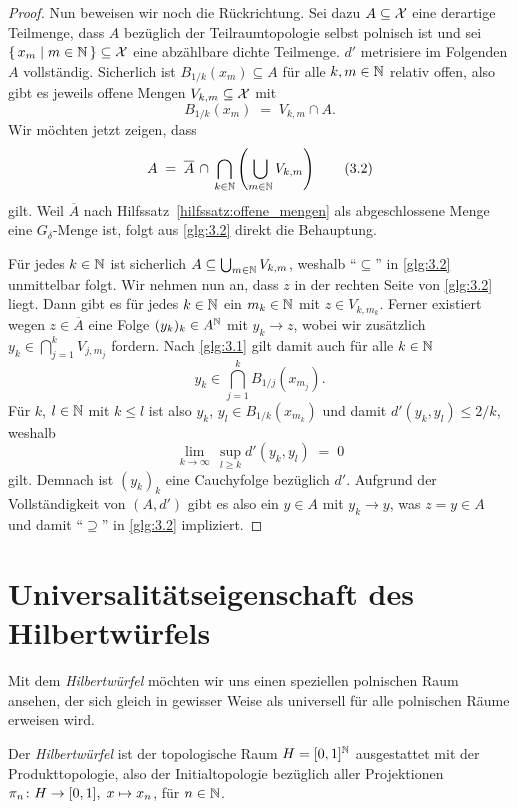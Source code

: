 \documentclass[../thesis/thesis.tex]{subfiles}
\begin{document}
\begin{proof}
		Nun beweisen wir noch die Rückrichtung. Sei dazu $A \subseteq \mathcal{X}$ eine derartige Teilmenge, dass
		$A$ bezüglich der Teilraumtopologie selbst polnisch ist und sei $\left\{\, x_m \; \middle| \; m \in \mathbb{N} \,\right\} \subseteq \mathcal{X}$ eine abzählbare dichte Teilmenge. 
		$d'$ metrisiere im Folgenden 
		$A$ vollständig.
		Sicherlich ist $B_{1/k}(x_m) \subseteq A$ für alle 
		$k, m \in \mathbb{N}$ relativ offen, also gibt es jeweils offene Mengen 
		$V_{k, m} \subseteq \mathcal{X}$ mit
		\[ B_{1/k}(x_m) \; = \; V_{k, m} 
		\cap A \text{.} \label{glg:3.1} \tag{3.1}\]
		Wir möchten jetzt zeigen, dass
		\[ A \; = \; \overline{A} \, \cap \, 
		\bigcap_{k \in \mathbb{N}} \left( \bigcup_{m \in \mathbb{N}} V_{k, m} \right) 
		\label{glg:3.2} \tag{3.2}\]
		gilt. 
		Weil $\overline{A}$ nach Hilfssatz~\ref{hilfssatz:offene_mengen} 
		als abgeschlossene Menge eine $G_\delta$-Menge ist, 
		folgt aus \eqref{glg:3.2} direkt die Behauptung.
		
		Für jedes $k \in \mathbb{N}$ ist sicherlich $A \subseteq 
		\bigcup_{m \in \mathbb{N}} V_{k, m}$, weshalb \enquote{$\subseteq$} 
		in \eqref{glg:3.2} unmittelbar folgt.
		Wir nehmen nun an, dass $z$ in der rechten Seite von \eqref{glg:3.2} liegt. 
		Dann gibt es für jedes $k \in \mathbb{N}$ ein $m_k \in \mathbb{N}$ mit $z \in V_{k, m_k}$. 
		Ferner existiert wegen $z \in \overline{A}$ eine Folge $(y_k)_k \in A^{\mathbb{N}}$ 
		mit $y_k \to z$, wobei wir zusätzlich
		$y_k \in \bigcap_{j=1}^{k} V_{j, m_j}$
		fordern. Nach \eqref{glg:3.1} gilt damit auch für alle $k \in \mathbb{N}$
		\[y_k \in \bigcap_{j=1}^{k} B_{1/j}(x_{m_j}) \text{.} \]
		Für $k$, $l \in \mathbb{N}$ mit $k \leq l$ ist also $y_k$, $y_l \in B_{1/k}(x_{m_k})$ und damit $d'(y_k, y_l) \leq 2/k$, weshalb 
		\[ \lim_{k \to \infty} \, \sup_{l \geq k} d'(y_k, y_l) \; = \; 0 \]
		gilt. Demnach ist $(y_k)_k$ eine Cauchyfolge bezüglich $d'$. Aufgrund der Vollständigkeit von 
		$(A, d')$ gibt es also ein $y \in A$ mit $y_k \to y$, was 
		$z = y \in A$ und damit \enquote{$\supseteq$} 
		in \eqref{glg:3.2} impliziert.
	\end{proof}

	\section{Universalitätseigenschaft des Hilbertwürfels}
	
	Mit dem \emph{Hilbertwürfel} möchten wir uns einen speziellen polnischen Raum ansehen, 
	der sich gleich in gewisser Weise als universell für alle polnischen Räume erweisen wird.
	
	\begin{Definition}[Hilbertwürfel]
		Der \emph{Hilbertwürfel} ist der topologische Raum $H = [0, 1]^{\mathbb{N}}$ 
		ausgestattet mit der Produkttopologie, also der Initialtopologie bezüglich 
		aller Projektionen $\pi_n \colon H \to [0, 1], \; x \mapsto x_n $, für $n \in \mathbb{N}$.
	\end{Definition}
	
\end{document}
